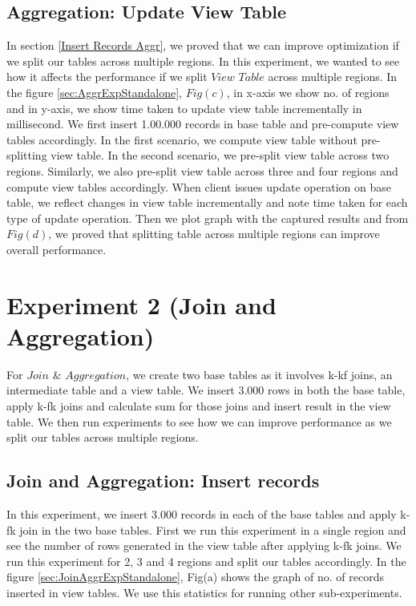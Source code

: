 \documentclass[11pt,a4paper,bibtotoc,idxtotoc,headsepline,footsepline,footexclude,BCOR12mm,DIV13]{scrbook}
\begin{document}
\subsection{Aggregation: Update View Table} 
\label{Update View Table Aggr}
In section \ref{Insert Records Aggr}, we proved that we can improve optimization if we split our tables across multiple regions. In this experiment, we wanted to see how it affects the performance if we split $View$ $Table$ across multiple regions. In the figure \ref{sec:AggrExpStandalone}, $Fig(c)$, in x-axis we show no. of regions and in y-axis, we show time taken to update view table incrementally in millisecond. We first insert 1.00.000 records in base table and pre-compute view tables accordingly. In the first scenario, we compute view table without pre-splitting view table. In the second scenario, we pre-split view table across two regions. Similarly, we also pre-split view table across three and four regions and compute view tables accordingly. When client issues update operation on base table, we reflect changes in view table incrementally and note time taken for each type of update operation. Then we plot graph with the captured results and from $Fig(d)$, we proved that splitting table across multiple regions can improve overall performance. 

\section{Experiment 2 (Join and Aggregation)}
\label{(sec:Join and Aggregation Exp)} 
For $Join$ \& $Aggregation$, we create two base tables as it involves k-kf joins, an intermediate table and a view table. We insert 3.000 rows in both the base table, apply k-fk joins and calculate sum for those joins and insert result in the view table. We then run experiments to see how we can improve performance as we split our tables across multiple regions.

\subsection{Join and Aggregation: Insert records}
\label{Join and Aggregation: Insert records Standalone}
In this experiment, we insert 3.000 records in each of the base tables and apply k-fk join in the two base tables. First we run this experiment in a single region and see the number of rows generated in the view table after applying k-fk joins. We run this experiment for 2, 3 and 4 regions and split our tables accordingly. In the figure \ref{sec:JoinAggrExpStandalone}, Fig(a) shows the graph of no. of records inserted in view tables. We use this statistics for running other sub-experiments.
\end{document}
